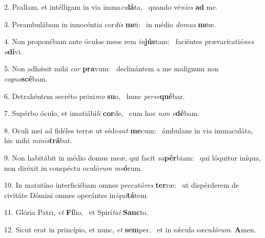 2. Psallam, et intélligam in via imma\textit{cu}\textbf{lá}ta, \ast\  quando vé\textit{ni}\textit{es} \textbf{ad} me.\

3. Perambulábam in innocéntia cor\textit{dis} \textbf{me}i: \ast\  in médio \textit{do}\textit{mus} \textbf{me}æ.\

4. Non proponébam ante óculos meos rem \textit{in}\textbf{jús}tam: \ast\  faciéntes prævaricatió\textit{nes} \textit{o}\textbf{dí}vi.\

5. Non adhǽsit mihi \textit{cor} \textbf{pra}vum: \ast\  declinántem a me malígnum non \textit{co}\textit{gno}\textbf{scé}bam.\

6. Detrahéntem secréto próxi\textit{mo} \textbf{su}o, \ast\  hunc \textit{per}\textit{se}\textbf{qué}bar.\

7. Supérbo óculo, et insatiábi\textit{li} \textbf{cor}de, \ast\  cum hoc \textit{non} \textit{e}\textbf{dé}bam.\

8. Oculi mei ad fidéles terræ ut séde\textit{ant} \textbf{me}cum: \ast\  ámbulans in via immaculáta, hic mihi \textit{mi}\textit{nis}\textbf{trá}bat.\

9. Non habitábit in médio domus meæ, qui facit \textit{su}\textbf{pér}biam: \ast\  qui lóquitur iníqua, non diréxit in conspéctu oculó\textit{rum} \textit{me}\textbf{ó}rum.\

10. In matutíno interficiébam omnes peccató\textit{res} \textbf{ter}ræ: \ast\  ut dispérderem de civitáte Dómini omnes operántes in\textit{i}\textit{qui}\textbf{tá}tem.\

11. Glória Patri, \textit{et} \textbf{Fí}lio, \ast\  et Spirí\textit{tu}\textit{i} \textbf{Sanc}to.\

12. Sicut erat in princípio, et nunc, \textit{et} \textbf{sem}per, \ast\  et in sǽcula sæcu\textit{ló}\textit{rum}. \textbf{A}men.\

